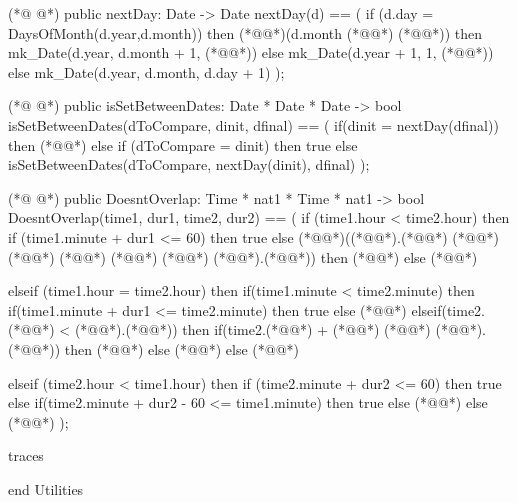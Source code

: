 \begin{vdmpp}[breaklines=true]
(*@
\label{nextDay:67}
@*)
 public nextDay: Date -> Date
  nextDay(d) ==
  (
   if (d.day = DaysOfMonth(d.year,d.month))
   then (*@@*)(d.month (*@\vdmnotcovered{<}@*) (*@@*))
      then mk_Date(d.year, d.month + 1, (*@@*))
      else
      mk_Date(d.year + 1, 1, (*@@*))
    else
    mk_Date(d.year, d.month, d.day + 1)
  );
  
  
(*@
\label{isSetBetweenDates:80}
@*)
 public isSetBetweenDates: Date * Date * Date -> bool
  isSetBetweenDates(dToCompare, dinit, dfinal) == (
   if(dinit = nextDay(dfinal))
   then (*@@*)
   else if (dToCompare = dinit)
   then true
   else isSetBetweenDates(dToCompare, nextDay(dinit), dfinal)
  );
   
   
(*@
\label{DoesntOverlap:90}
@*)
 public DoesntOverlap: Time * nat1 * Time * nat1 -> bool
  DoesntOverlap(time1, dur1, time2, dur2) == (
   if (time1.hour < time2.hour)
   then if (time1.minute + dur1 <= 60)
     then true
     else (*@@*)((*@@*).(*@@*) (*@\vdmnotcovered{+}@*) (*@@*) (*@\vdmnotcovered{-}@*) (*@@*) (*@\vdmnotcovered{<=}@*) (*@@*).(*@@*))
        then (*@@*)
        else (*@@*)
 
   elseif  (time1.hour = time2.hour)
   then if(time1.minute < time2.minute)
      then if(time1.minute + dur1 <= time2.minute)
         then true
         else (*@@*)
      elseif(time2.(*@@*) < (*@@*).(*@@*))
      then if(time2.(*@@*) + (*@@*) (*@\vdmnotcovered{<=}@*) (*@@*).(*@@*))
         then (*@@*)
         else (*@@*)
       else (*@@*)
       
   elseif (time2.hour < time1.hour)
   then if (time2.minute + dur2 <= 60)
     then true
     else if(time2.minute + dur2 - 60 <= time1.minute)
        then true
        else (*@@*)
   else (*@@*)
  );
  
traces

end Utilities
\end{vdmpp}
\bigskip
